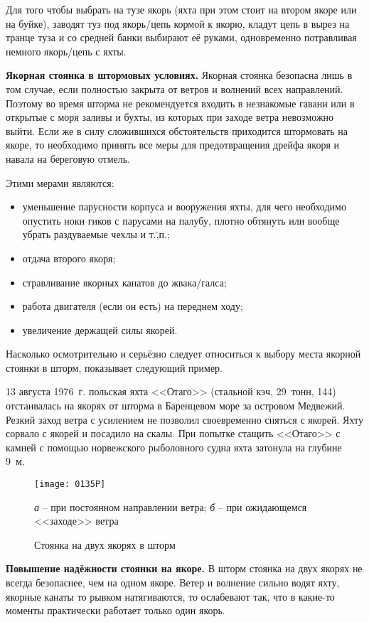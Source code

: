 Для того чтобы выбрать на тузе якорь (яхта при этом стоит на втором
якоре или на буйке), заводят туз под якорь\-/цепь кормой к якорю,
кладут цепь в вырез на транце туза и со средней банки выбирают её
руками, одновременно потравливая немного якорь\-/цепь с яхты.

\textbf{Якорная стоянка в штормовых условиях.} Якорная стоянка
безопасна лишь в том случае, если полностью закрыта от ветров и
волнений всех направлений. Поэтому во время шторма не рекомендуется
входить в незнакомые гавани или в открытые с моря заливы и бухты, из
которых при заходе ветра невозможно выйти. Если же в силу сложившихся
обстоятельств приходится штормовать на якоре, то необходимо принять
все меры для предотвращения дрейфа якоря и навала на береговую отмель.

Этими мерами являются: 
\begin{itemize}
\item уменьшение парусности корпуса и вооружения яхты, для чего
  необходимо опустить ноки гиков с парусами на палубу, плотно обтянуть
  или вообще убрать раздуваемые чехлы и т.\=,п.;
\item отдача второго якоря; 
\item стравливание якорных канатов до жвака\-/галса; 
\item работа двигателя (если он есть) на переднем ходу; 
\item увеличение держащей силы якорей. 
\end{itemize}

Насколько осмотрительно и серьёзно следует относиться к выбору места
якорной стоянки в шторм, показывает следующий пример.

{\small 13 августа 1976~г. польская яхта <<Отаго>> (стальной кэч,
  29~тонн, 144\msq) отстаивалась на якорях от шторма в Баренцевом море
  за островом Медвежий. Резкий заход ветра с усилением не позволил
  своевременно сняться с якорей. Яхту сорвало с якорей и посадило на
  скалы. При попытке стащить <<Отаго>> с камней с помощью норвежского
  рыболовного судна яхта затонула на глубине 9~м.}

\begin{figure}[h]
  \centering{}
  \texttt{[image: 0135P]}
  \caption{Стоянка на двух якорях в шторм}
  \label{fig:135}
  \small
  \centering{}
  \textit{а} \--- при постоянном направлении ветра; \textit{б} \--- при ожидающемся <<заходе>> ветра
\end{figure}

\textbf{Повышение надёжности стоянки на якоре.} В шторм стоянка на
двух якорях не всегда безопаснее, чем на одном якоре. Ветер и волнение
сильно водят яхту, якорные канаты то рывком натягиваются, то
ослабевают так, что в какие-то моменты практически работает только
один якорь.


